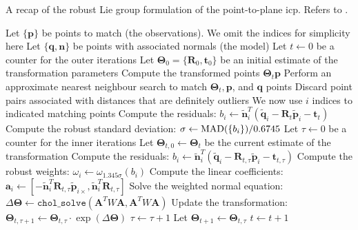 \begin{algorithm}
\caption{A recap of the robust Lie group formulation of the point-to-plane \gls{icp}. Refers to .}\label{c1:alg:liep2plan}
\begin{algorithmic}
\State Let $\{\mathbf{p}\}$ be points to match (the observations). We omit the indices for simplicity here
\State Let $\{\mathbf{q},\mathbf{n}\}$ be points with associated normals (the model)
\State Let $t \gets 0$ be a counter for the outer iterations
\State Let $\mathbf{\Theta}_0 = \{\mathbf{R}_0,\mathbf{t}_0\}$ be an initial estimate of the transformation parameters
  \State Compute the transformed points $\mathbf{\Theta}_t \mathbf{p}$
  \State Perform an approximate nearest neighbour search to match $\mathbf{\Theta}_t, \mathbf{p}$, and $\mathbf{q}$ points
  \State Discard point pairs associated with distances that are definitely outliers
  \State We now use $i$ indices to indicated matching points
  \State Compute the residuals: $b_i \gets \tilde{\mathbf{n}}_i^T (\tilde{\mathbf{q}}_i - \mathbf{R}_t \tilde{\mathbf{p}}_i - \mathbf{t}_t)$
  \State {}
  \State Compute the robust standard deviation: $\sigma \gets \operatorname{MAD}(\{b_i\})/0.6745$
  \State {}
  \State Let $\tau \gets 0$ be a counter for the inner iterations
  \State Let $\mathbf{\Theta}_{t,0} \gets \mathbf{\Theta}_{t}$ be the current estimate of the transformation
      \State Compute the residuals: $b_i \gets \tilde{\mathbf{n}}_i^T (\tilde{\mathbf{q}}_i - \mathbf{R}_{t,\tau} \tilde{\mathbf{p}}_i - \mathbf{t}_{t,\tau})$
    \EndIf
    \State Compute the robust weights: $\omega_i \gets \omega_{1.345\sigma}(b_i)$
    \State Compute the linear coefficients: $\mathbf{a}_i \gets [-\tilde{\mathbf{n}}_i^T \mathbf{R}_{t,\tau} {{\tilde{\mathbf{p}}}_{i\times}}, \tilde{\mathbf{n}}_i^T \mathbf{R}_{t,\tau}]$
    \State Solve the weighted normal equation:
    \State \quad $\Delta\mathbf{\Theta} \gets \texttt{chol\_solve}(\mathbf{A}^T W \mathbf{A}, \mathbf{A}^T W \mathbf{A})$
    \State Update the transformation: $\mathbf{\Theta}_{t,\tau+1} \gets \mathbf{\Theta}_{t,\tau} \cdot \exp(\Delta\mathbf{\Theta})$
    \State $\tau \gets \tau+1$
  \EndWhile
  \State Let $\mathbf{\Theta}_{t+1} \gets \mathbf{\Theta}_{t,\tau}$
  \State $t \gets t+1$
\EndWhile
\end{algorithmic}
\end{algorithm}
